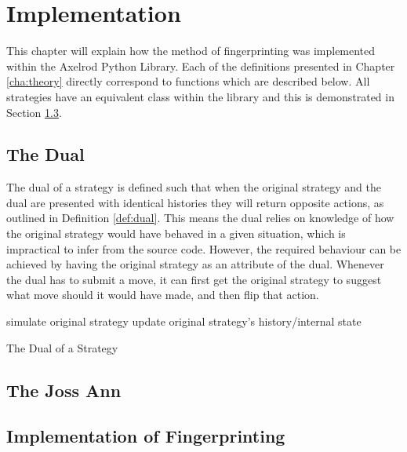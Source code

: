 
\chapter{Implementation}\label{cha:implementation}

This chapter will explain how the method of fingerprinting was implemented within the Axelrod Python Library.
Each of the definitions presented in Chapter \ref{cha:theory} directly correspond to functions which are described below.
All strategies have an equivalent class within the library and this is demonstrated in Section \ref{sec:fingerprint-implementation}.

\section{The Dual}
The dual of a strategy is defined such that when the original strategy and the dual are presented with identical histories they will return opposite actions, as outlined in Definition \ref{def:dual}. %
This means the dual relies on knowledge of how the original strategy would have behaved in a given situation, which is impractical to infer from the source code.
However, the required behaviour can be achieved by having the original strategy as an attribute of the dual.
Whenever the dual has to submit a move, it can first get the original strategy to suggest what move should it would have made, and then flip that action.

\IncMargin{1.2em}
\begin{algorithm}[H]
  simulate original strategy\;
  update original strategy's history/internal state\;
 \caption{The Dual of a Strategy}
\end{algorithm}\DecMargin{1.5em}

\section{The Joss Ann}

\section{Implementation of Fingerprinting}\label{sec:fingerprint-implementation}

